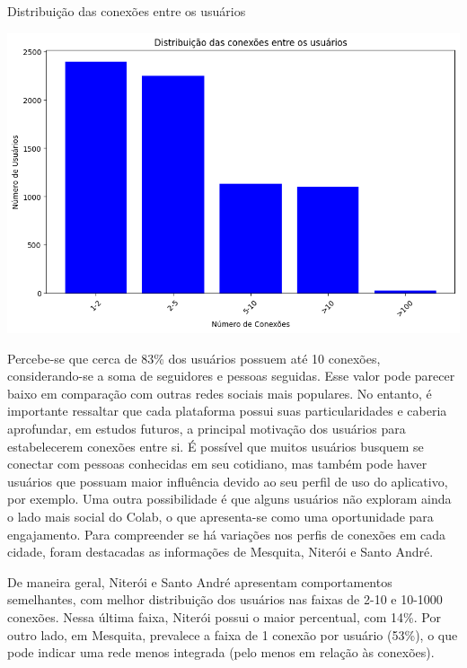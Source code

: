 \begin{quadro}[!htb]
	\caption{Distribuição das conexões entre os usuários}
	\label{fig:colab_users_by_connection}
	\centering
	\includegraphics[scale=0.7]{images/colab_users_by_connection.png}
\end{quadro}

Percebe-se que cerca de 83\% dos usuários possuem até 10 conexões, considerando-se a soma de seguidores e pessoas seguidas. Esse valor pode parecer baixo em comparação com outras redes sociais mais populares. No entanto, é importante ressaltar que cada plataforma possui suas particularidades e caberia aprofundar, em estudos futuros, a principal motivação dos usuários para estabelecerem conexões entre si. É possível que muitos usuários busquem se conectar com pessoas conhecidas em seu cotidiano, mas também pode haver usuários que possuam maior influência devido ao seu perfil de uso do aplicativo, por exemplo. Uma outra possibilidade é que alguns usuários não exploram ainda o lado mais social do Colab, o que apresenta-se como uma oportunidade para engajamento. Para compreender se há variações nos perfis de conexões em cada cidade, foram destacadas as informações de Mesquita, Niterói e Santo André.

De maneira geral, Niterói e Santo André apresentam comportamentos semelhantes, com melhor distribuição dos usuários nas faixas de 2-10 e 10-1000 conexões. Nessa última faixa, Niterói possui o maior percentual, com 14\%. Por outro lado, em Mesquita, prevalece a faixa de 1 conexão por usuário (53\%), o que pode indicar uma rede menos integrada (pelo menos em relação às conexões).


